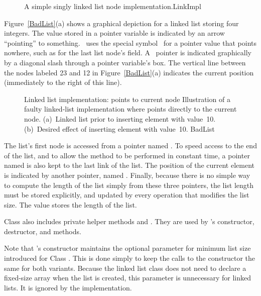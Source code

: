 \begin{figure}
\vspace{-\bigskipamount}

{A simple singly linked list node implementation.}{LinkImpl}
\end{figure}

Figure~\ref{BadList}(a) shows a graphical depiction for a linked list
storing four integers.
The value stored in a pointer variable is indicated by an arrow
``pointing'' to something.
\Lang\ uses the special symbol \NULL\ for a
pointer value that points nowhere, such as for the last list node's
 field.
A \NULL\ pointer is indicated graphically by a diagonal slash
through a pointer variable's box.
The vertical line between the nodes labeled 23 and 12 in
Figure~\ref{BadList}(a) indicates the current position
(immediately to the right of this line).

\begin{figure}
\capt{4.5in}
{Linked list implementation:  points to current node}
{Illustration of a faulty linked-list implementation where
 points directly to the
current node.
(a)~Linked list prior to inserting element with value~10.
(b)~Desired effect of inserting element with
value~10.}
{BadList}
\bigskip
\end{figure}

The list's first node is accessed from a pointer named
.
To speed access to the end of the list, and to allow the
 method to be performed in
constant time, a pointer named  is also kept to the last
link of the list.
The position of the current element is indicated by another pointer,
named .
Finally, because there is no simple way to compute the length of the
list simply from these three pointers, the list length must be stored
explicitly, and updated by every operation that modifies the list size.
The value  stores the length of the list.

{Class  also includes private helper methods
 and .
They are used by 's constructor, destructor,
and  methods.}{}

Note that 's constructor maintains the optional parameter
for minimum list size introduced for Class .
This is done simply to keep the calls to the constructor
the same for both variants.
Because the linked list class does not need to declare a fixed-size
array when the list is created, this parameter is unnecessary for
linked lists.
It is ignored by the implementation.

